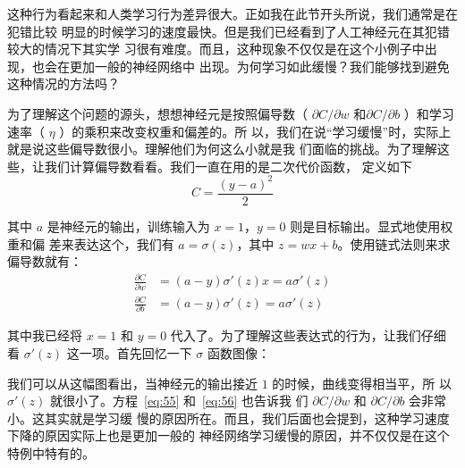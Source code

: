 这种行为看起来和人类学习行为差异很大。正如我在此节开头所说，我们通常是在犯错比较
明显的时候学习的速度最快。但是我们已经看到了人工神经元在其犯错较大的情况下其实学
习很有难度。而且，这种现象不仅仅是在这个小例子中出现，也会在更加一般的神经网络中
出现。为何学习如此缓慢？我们能够找到避免这种情况的方法吗？

为了理解这个问题的源头，想想神经元是按照偏导数（ $\partial C/\partial
w$ 和$\partial C/\partial b$ ）和学习速率（ $\eta$ ）的乘积来改变权重和偏差的。所
以，我们在说``学习缓慢''时，实际上就是说这些偏导数很小。理解他们为何这么小就是我
们面临的挑战。为了理解这些，让我们计算偏导数看看。我们一直在用的是二次代价函数，
定义如下
\begin{equation}
  C = \frac{(y-a)^2}{2}
\label{eq:54}\tag{54}
\end{equation}

其中 $a$ 是神经元的输出，训练输入为 $x=1$，$y=0$ 则是目标输出。显式地使用权重和偏
差来表达这个，我们有 $a=\sigma(z)$，其中 $z=wx+b$。使用链式法则来求偏导数就有：
\begin{align} 
  \frac{\partial C}{\partial w} &= (a-y)\sigma'(z) x = a \sigma'(z)\label{eq:55}\tag{55}\\  
  \frac{\partial C}{\partial b} &= (a-y)\sigma'(z) = a \sigma'(z)\label{eq:56}\tag{56}
\end{align}

其中我已经将 $x=1$ 和 $y=0$ 代入了。为了理解这些表达式的行为，让我们仔细
看 $\sigma'(z)$ 这一项。首先回忆一下 $\sigma$ 函数图像：
\begin{center}
\end{center}

我们可以从这幅图看出，当神经元的输出接近 $1$ 的时候，曲线变得相当平，所
以 $\sigma'(z)$ 就很小了。方程~\eqref{eq:55} 和~\eqref{eq:56} 也告诉我
们 $\partial C/\partial w$ 和 $\partial C/\partial b$ 会非常小。这其实就是学习缓
慢的原因所在。而且，我们后面也会提到，这种学习速度下降的原因实际上也是更加一般的
神经网络学习缓慢的原因，并不仅仅是在这个特例中特有的。

